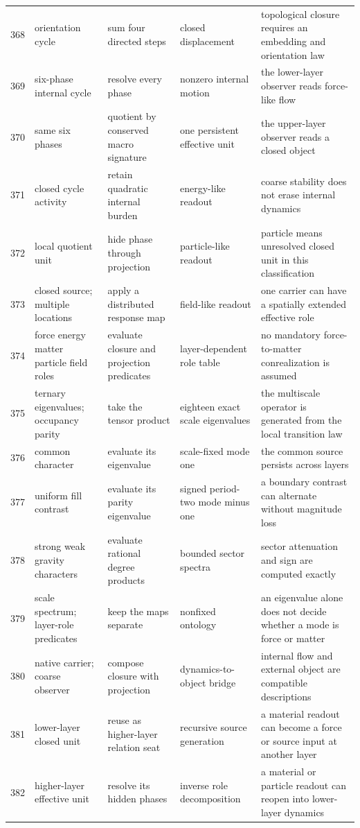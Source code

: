 \documentclass[11pt]{article}
\numberwithin{equation}{section}
\theoremstyle{remark}
\begin{document}
\begin{landscape}
\begin{longtable}{p{0.65cm}p{3.5cm}p{4.0cm}p{4.0cm}p{4.6cm}}
368&orientation cycle&sum four directed steps&closed displacement&topological closure requires an embedding and orientation law\\
369&six-phase internal cycle&resolve every phase&nonzero internal motion&the lower-layer observer reads force-like flow\\
370&same six phases&quotient by conserved macro signature&one persistent effective unit&the upper-layer observer reads a closed object\\
371&closed cycle activity&retain quadratic internal burden&energy-like readout&coarse stability does not erase internal dynamics\\
372&local quotient unit&hide phase through projection&particle-like readout&particle means unresolved closed unit in this classification\\
373&closed source; multiple locations&apply a distributed response map&field-like readout&one carrier can have a spatially extended effective role\\
374&force energy matter particle field roles&evaluate closure and projection predicates&layer-dependent role table&no mandatory force-to-matter conrealization is assumed\\
375&ternary eigenvalues; occupancy parity&take the tensor product&eighteen exact scale eigenvalues&the multiscale operator is generated from the local transition law\\
376&common character&evaluate its eigenvalue&scale-fixed mode one&the common source persists across layers\\
377&uniform fill contrast&evaluate its parity eigenvalue&signed period-two mode minus one&a boundary contrast can alternate without magnitude loss\\
378&strong weak gravity characters&evaluate rational degree products&bounded sector spectra&sector attenuation and sign are computed exactly\\
379&scale spectrum; layer-role predicates&keep the maps separate&nonfixed ontology&an eigenvalue alone does not decide whether a mode is force or matter\\
380&native carrier; coarse observer&compose closure with projection&dynamics-to-object bridge&internal flow and external object are compatible descriptions\\
381&lower-layer closed unit&reuse as higher-layer relation seat&recursive source generation&a material readout can become a force or source input at another layer\\
382&higher-layer effective unit&resolve its hidden phases&inverse role decomposition&a material or particle readout can reopen into lower-layer dynamics\\

\end{longtable}
\end{landscape}
\end{document}
